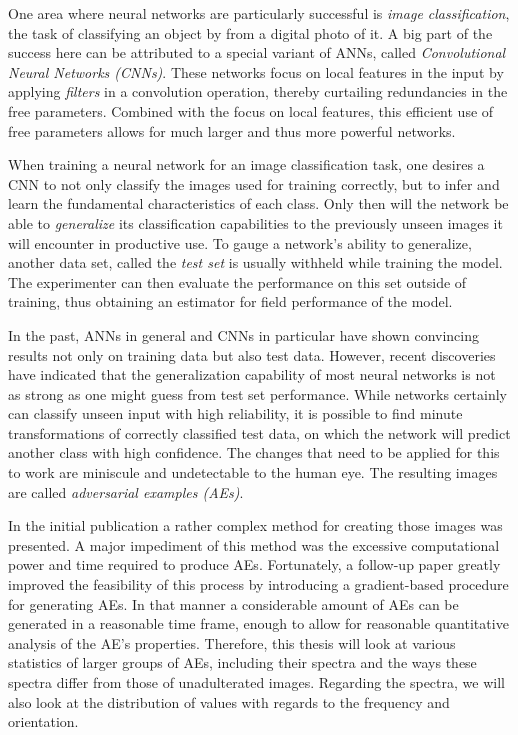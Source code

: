 \documentclass[11pt, a4paper]{article}
\begin{document}
One area where neural networks are particularly successful is \emph{image classification}, the task of classifying an object by from a digital photo of it. A big part of the success here can be attributed to a special variant of ANNs, called \emph{Convolutional Neural Networks (CNNs)}. These networks focus on local features in the input by applying \emph{filters} in a convolution operation, thereby curtailing redundancies in the free parameters. Combined with the focus on local features, this efficient use of free parameters allows for much larger and thus more powerful networks.

When training a neural network for an image classification task, one desires a CNN to not only classify the images used for training correctly, but to infer and learn the fundamental characteristics of each class. Only then will the network be able to \emph{generalize} its classification capabilities to the previously unseen images it will encounter in productive use. To gauge a network's ability to generalize, another data set, called the \emph{test set} is usually withheld while training the model. The experimenter can then evaluate the performance on this set outside of training, thus obtaining an estimator for field performance of the model.

In the past, ANNs in general and CNNs in particular have shown convincing results not only on training data but also test data. However, recent discoveries have indicated that the generalization capability of most neural networks is not as strong as one might guess from test set performance. While networks certainly can classify unseen input with high reliability, it is possible to find minute transformations of correctly classified test data, on which the network will predict another class with high confidence. The changes that need to be applied for this to work are miniscule and undetectable to the human eye. The resulting images are called \emph{adversarial examples (AEs)}.

In the initial publication a rather complex method for creating those images was presented. A major impediment of this method was the excessive computational power and time required to produce AEs. Fortunately, a follow-up paper greatly improved the feasibility of this process by introducing a gradient-based procedure for generating AEs. In that manner a considerable amount of AEs can be generated in a reasonable time frame, enough to allow for reasonable quantitative analysis of the AE's properties. Therefore, this thesis will look at various statistics of larger groups of AEs, including their spectra and the ways these spectra differ from those of unadulterated images. Regarding the spectra, we will also look at the distribution of values with regards to the frequency and orientation.
\end{document}
